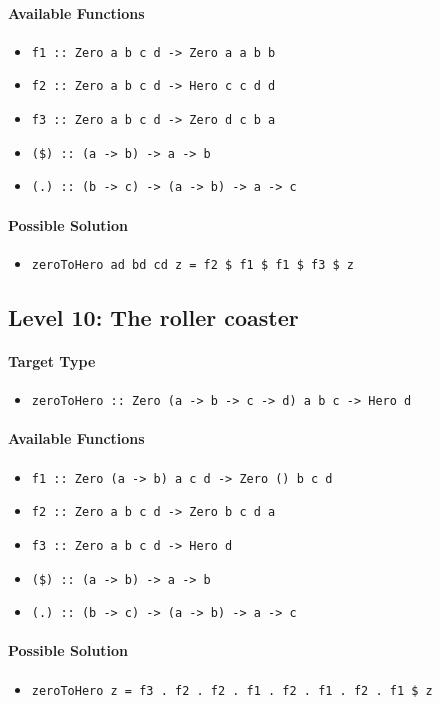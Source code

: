 \documentclass[preprint,12pt]{elsarticle}
\begin{document}
\paragraph{Available Functions} 
\begin{itemize}
    \item \texttt{f1 :: Zero a b c d -> Zero a a b b}
    \item \texttt{f2 :: Zero a b c d -> Hero c c d d}
    \item \texttt{f3 :: Zero a b c d -> Zero d c b a}
    \item \texttt{(\$) :: (a -> b) -> a -> b}
    \item \texttt{(.) :: (b -> c) -> (a -> b) -> a -> c}
\end{itemize}

\paragraph{Possible Solution} 
\begin{itemize}
    \item \texttt{zeroToHero ad bd cd z = f2 \$ f1 \$ f1 \$ f3 \$ z}
\end{itemize}


\subsection{Level 10: The roller coaster}
\paragraph{Target Type } 
\begin{itemize}
    \item \texttt{zeroToHero :: Zero (a -> b -> c -> d) a b c  -> Hero d}
\end{itemize}

\paragraph{Available Functions} 
\begin{itemize}
    \item \texttt{f1 :: Zero (a -> b) a c d -> Zero () b c d}
    \item \texttt{f2 :: Zero a b c d -> Zero b c d a}
    \item \texttt{f3 :: Zero a b c d -> Hero d}
    \item \texttt{(\$) :: (a -> b) -> a -> b}
    \item \texttt{(.) :: (b -> c) -> (a -> b) -> a -> c}
\end{itemize}

\paragraph{Possible Solution} 
\begin{itemize}
    \item \texttt{zeroToHero z = f3 . f2 . f2 . f1 . f2 . f1 . f2 . f1 \$ z}
\end{itemize}
\end{document}
